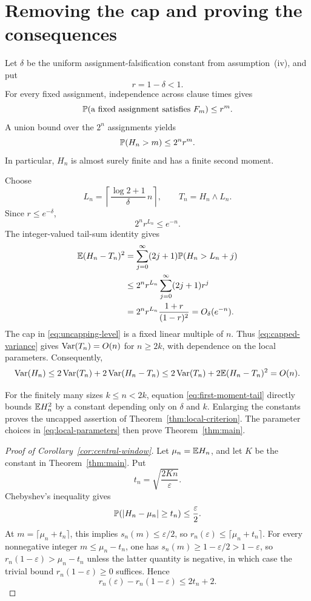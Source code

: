\section{Removing the cap and proving the consequences}
\label{sec:uncapping}

Let $\delta$ be the uniform assignment-falsification constant from
assumption~(iv), and put
\[
    r=1-\delta<1.
\]
For every fixed assignment, independence across clause times gives
\[
    \mathbb P(\text{a fixed assignment satisfies }F_m)\le r^m.
\]
A union bound over the $2^n$ assignments yields
\begin{equation}
    \mathbb P(H_n>m)\le 2^n r^m.
    \label{eq:first-moment-tail}
\end{equation}
In particular, $H_n$ is almost surely finite and has a finite second moment.

Choose
\begin{equation}
    L_n=
    \left\lceil
      \frac{\log2+1}{\delta}\,n
    \right\rceil,
    \qquad
    T_n=H_n\wedge L_n.
    \label{eq:uncapping-level}
\end{equation}
Since $r\le e^{-\delta}$,
\[
    2^n r^{L_n}\le e^{-n}.
\]
The integer-valued tail-sum identity gives
\begin{align}
    \mathbb E(H_n-T_n)^2
    &=\sum_{j=0}^\infty(2j+1)\mathbb P(H_n>L_n+j)
      \notag\\
    &\le
      2^n r^{L_n}
      \sum_{j=0}^\infty(2j+1)r^j
      \notag\\
    &=2^n r^{L_n}\frac{1+r}{(1-r)^2}
      =O_{\delta}(e^{-n}).
    \label{eq:cap-error}
\end{align}
The cap in \eqref{eq:uncapping-level} is a fixed linear multiple of $n$.
Thus \eqref{eq:capped-variance} gives $\operatorname{Var}(T_n)=O(n)$ for
$n\ge2k$, with dependence on the local parameters.  Consequently,
\[
    \operatorname{Var}(H_n)
    \le
    2\operatorname{Var}(T_n)+2\operatorname{Var}(H_n-T_n)
    \le
    2\operatorname{Var}(T_n)+2\mathbb E(H_n-T_n)^2
    =O(n).
\]

For the finitely many sizes $k\le n<2k$, equation
\eqref{eq:first-moment-tail} directly bounds $\mathbb E H_n^2$ by a constant
depending only on $\delta$ and $k$.  Enlarging the constants proves the
uncapped assertion of Theorem~\ref{thm:local-criterion}.  The parameter
choices in \eqref{eq:local-parameters} then prove
Theorem~\ref{thm:main}.

\begin{proof}[Proof of Corollary~\ref{cor:central-window}]
Let $\mu_n=\mathbb E H_n$, and let $K$ be the constant in
Theorem~\ref{thm:main}.  Put
\[
    t_n=\sqrt{\frac{2Kn}{\varepsilon}}.
\]
Chebyshev's inequality gives
\[
    \mathbb P(|H_n-\mu_n|\ge t_n)\le\frac{\varepsilon}{2}.
\]
At $m=\lceil\mu_n+t_n\rceil$, this implies $s_n(m)\le\varepsilon/2$, so
$r_n(\varepsilon)\le\lceil\mu_n+t_n\rceil$.  For every nonnegative integer
$m\le\mu_n-t_n$, one has
$s_n(m)\ge1-\varepsilon/2>1-\varepsilon$, so
$r_n(1-\varepsilon)>\mu_n-t_n$ unless the latter quantity is negative, in
which case the trivial bound $r_n(1-\varepsilon)\ge0$ suffices.  Hence
\[
    r_n(\varepsilon)-r_n(1-\varepsilon)
    \le 2t_n+2.
\]
\end{proof}
